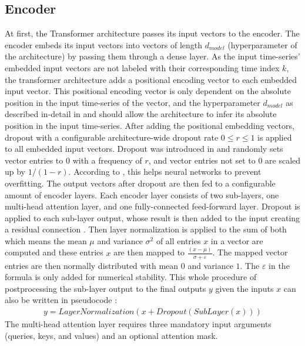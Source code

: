 \documentclass[draft,final]{vutinfth} %
\begin{document}
    \subsection{Encoder} \label{encoder}
    At first, the Transformer architecture passes its input vectors to the encoder.
    The encoder embeds its input vectors into vectors of length $d_{model}$ (hyperparameter of the architecture) by passing them through a dense layer.
    As the input time-series' embedded input vectors are not labeled with their corresponding time index $k$, the transformer architecture adds a positional encoding vector to each embedded input vector.
    This positional encoding vector is only dependent on the absolute position in the input time-series of the vector, and the hyperparameter $d_{model}$ as described in-detail in \cite[p. 6]{Transformer} and should allow the architecture to infer its absolute position in the input time-series.
    After adding the positional embedding vectors, dropout with a configurable architecture-wide dropout rate $0 \leq r \leq 1$ is applied to all embedded input vectors.
    Dropout was introduced in \cite{dropout} and randomly sets vector entries to $0$ with a frequency of $r$, and vector entries not set to $0$ are scaled up by $1/(1-r)$.
    According to \cite[p. 1]{dropout}, this helps neural networks to prevent overfitting.
    The output vectors after dropout are then fed to a configurable amount of encoder layers.
    Each encoder layer consists of two sub-layers, one multi-head attention layer, and one fully-connected feed-forward layer.
    Dropout is applied to each sub-layer output, whose result is then added to the input creating a residual connection \cite{ResNet}.
    Then layer normalization \cite{layer_norm} is applied to the sum of both which means the mean $\mu$ and variance $\sigma^2$ of all entries $x$ in a vector are computed and these entries $x$ are then mapped to $\frac{(x-\mu)}{\sigma + \varepsilon}$.
    The mapped vector entries are then normally distributed with mean $0$ and variance $1$. The $\varepsilon$ in the formula is only added for numerical stability.
    This whole procedure of postprocessing the sub-layer output to the final outputs $y$ given the inputs $x$ can also be written in pseudocode \cite[p. 3]{Transformer}:
    \begin{align}
    y = LayerNormalization(x + Dropout(SubLayer(x)))
    \end{align}
    The multi-head attention layer requires three mandatory input arguments (queries, keys, and values) and an optional attention mask.
\end{document}
